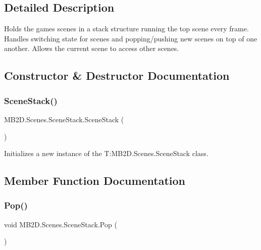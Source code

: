 \subsection{Detailed Description}
Holds the games scenes in a stack structure running the top scene every frame. Handles switching state for scenes and popping/pushing new scenes on top of one another. Allows the current scene to access other scenes. 



\subsection{Constructor \& Destructor Documentation}
\hypertarget{class_m_b2_d_1_1_scenes_1_1_scene_stack_afae8584f72ea2eb6848af3781e7c4137}{}\label{class_m_b2_d_1_1_scenes_1_1_scene_stack_afae8584f72ea2eb6848af3781e7c4137} 
\subsubsection{\texorpdfstring{Scene\+Stack()}{SceneStack()}}
{\footnotesize\ttfamily M\+B2\+D.\+Scenes.\+Scene\+Stack.\+Scene\+Stack (\begin{DoxyParamCaption}{ }\end{DoxyParamCaption})\hspace{0.3cm}{\ttfamily [inline]}}



Initializes a new instance of the T\+:\+M\+B2\+D.\+Scenes.\+Scene\+Stack class. 



\subsection{Member Function Documentation}
\hypertarget{class_m_b2_d_1_1_scenes_1_1_scene_stack_a134c3aff1731fb86116b78cac7112464}{}\label{class_m_b2_d_1_1_scenes_1_1_scene_stack_a134c3aff1731fb86116b78cac7112464} 
\subsubsection{\texorpdfstring{Pop()}{Pop()}}
{\footnotesize\ttfamily void M\+B2\+D.\+Scenes.\+Scene\+Stack.\+Pop (\begin{DoxyParamCaption}{ }\end{DoxyParamCaption})\hspace{0.3cm}{\ttfamily [inline]}}



